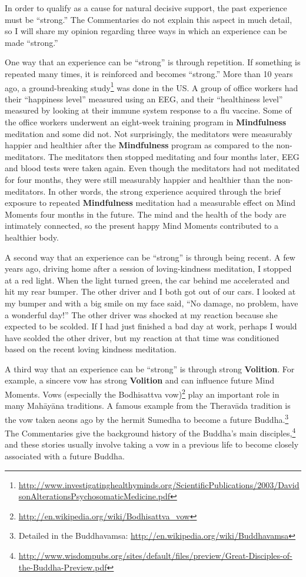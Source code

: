 In order to qualify as a cause for natural decisive support, the past experience must be “strong.” The Commentaries do not explain this aspect in much detail, so I will share my opinion regarding three ways in which an experience can be made “strong.”

\pagebreak

One way that an experience can be “strong” is through repetition. If something is repeated many times, it is reinforced and becomes “strong.” More than 10 years ago, a ground-breaking study\footnote{\url{http://www.investigatinghealthyminds.org/ScientificPublications/2003/DavidsonAlterationsPsychosomaticMedicine.pdf}} was done in the US. A group of office workers had their “happiness level” measured using an EEG, and their “healthiness level” measured by looking at their immune system response to a flu vaccine. Some of the office workers underwent an eight-week training program in \textbf{Mindfulness} meditation and some did not. Not surprisingly, the meditators were measurably happier and healthier after the \textbf{Mindfulness} program as compared to the non-meditators. The meditators then stopped meditating and four months later, EEG and blood tests were taken again. Even though the meditators had not meditated for four months, they were still measurably happier and healthier than the non-meditators. In other words, the strong experience acquired through the brief exposure to repeated \textbf{Mindfulness} meditation had a measurable effect on Mind Moments four months in the future. The mind and the health of the body are intimately connected, so the present happy Mind Moments contributed to a healthier body.

A second way that an experience can be “strong” is through being recent. A few years ago, driving home after a session of loving-kindness meditation, I stopped at a red light. When the light turned green, the car behind me accelerated and hit my rear bumper. The other driver and I both got out of our cars. I looked at my bumper and with a big smile on my face said, “No damage, no problem, have a wonderful day!” The other driver was shocked at my reaction because she expected to be scolded. If I had just finished a bad day at work, perhaps I would have scolded the other driver, but my reaction at that time was conditioned based on the recent loving kindness meditation.

A third way that an experience can be “strong” is through strong \textbf{Volition}. For example, a sincere vow has strong \textbf{Volition} and can influence future Mind Moments. Vows (especially the Bodhisattva vow)\footnote{\url{http://en.wikipedia.org/wiki/Bodhisattva_vow}} play an important role in many Mahāyāna traditions. A famous example from the Theravāda tradition is the vow taken aeons ago by the hermit Sumedha to become a future Buddha.\footnote{Detailed in the Buddhavamsa: \url{http://en.wikipedia.org/wiki/Buddhavamsa}} The Commentaries give the background history of the Buddha’s main disciples,\footnote{\url{http://www.wisdompubs.org/sites/default/files/preview/Great-Disciples-of-the-Buddha-Preview.pdf}} and these stories usually involve taking a vow in a previous life to become closely associated with a future Buddha.

